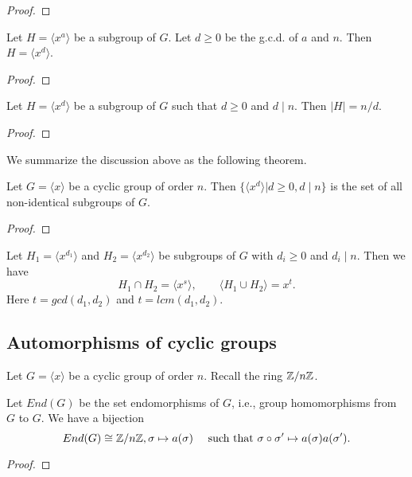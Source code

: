 \begin{proof}

\end{proof}

\begin{cor}
    Let $H= \langle x^a \rangle $ be a subgroup of $G$. Let $d \ge 0$ be the g.c.d. of $a$ and $n$. Then $H =  \langle x^d \rangle $.
\end{cor}
\begin{proof}

\end{proof}

\begin{cor}
    Let $H= \langle x^d \rangle $ be a subgroup of $G$ such that $d \ge 0$ and  $d \mid n$. Then $|H| =n/d$.
\end{cor}
\begin{proof}

\end{proof}


We summarize the discussion above as the following theorem.

\begin{thm}
    Let $G = \langle x \rangle$ be a cyclic group of order $n$.
    Then $\{\langle x^d \rangle \vert d \ge 0, d \mid n\}$ is the set of all non-identical subgroups of $G$.
\end{thm}

\begin{proof}

\end{proof}

\begin{prop}
    Let $H_1 = \langle x^{d_1} \rangle$ and $H_2 = \langle x^{d_2} \rangle$ be subgroups of $G$ with $d_i \ge 0$ and $d_i \mid n$. Then we have
    \[
        H_1 \cap H_2 = \langle x^{s} \rangle, \qquad \langle H_1 \cup H_2 \rangle = x^{t}.
    \]
    Here $t = gcd(d_1, d_2)$ and $t = lcm (d_1, d_2)$.
\end{prop}

\subsection{Automorphisms of cyclic groups}

Let $G = \langle x \rangle$ be a cyclic group of order $n$. Recall the ring $\mathbb {Z}/n\mathbb {Z}$.
\begin{lem}
    Let $End(G)$ be the set endomorphisms of $G$, i.e., group homomorphisms from $G$ to $G$. We have a bijection
    \[
        End(G) \cong \mathbb {Z}/n\mathbb {Z}, \sigma \mapsto a(\sigma) \quad \text{ such that } \sigma \circ \sigma' \mapsto  a(\sigma) a(\sigma').
    \]
\end{lem}
\begin{proof}
\end{proof}

